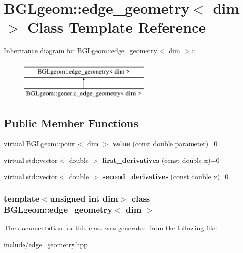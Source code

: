\hypertarget{classBGLgeom_1_1edge__geometry}{
\section{BGLgeom::edge\_\-geometry$<$ dim $>$ Class Template Reference}
\label{classBGLgeom_1_1edge__geometry}
}
Inheritance diagram for BGLgeom::edge\_\-geometry$<$ dim $>$::\begin{figure}[H]
\begin{center}
\leavevmode
\includegraphics[height=2cm]{classBGLgeom_1_1edge__geometry}
\end{center}
\end{figure}
\subsection*{Public Member Functions}
\begin{DoxyCompactItemize}
\item 
\hypertarget{classBGLgeom_1_1edge__geometry_ae4e0868c01e2e490eea053e6942b0aef}{
virtual \hyperlink{classBGLgeom_1_1point}{BGLgeom::point}$<$ dim $>$ {\bfseries value} (const double parameter)=0}
\label{classBGLgeom_1_1edge__geometry_ae4e0868c01e2e490eea053e6942b0aef}

\item 
\hypertarget{classBGLgeom_1_1edge__geometry_a41d857a2978d96127fc1797232183844}{
virtual std::vector$<$ double $>$ {\bfseries first\_\-derivatives} (const double x)=0}
\label{classBGLgeom_1_1edge__geometry_a41d857a2978d96127fc1797232183844}

\item 
\hypertarget{classBGLgeom_1_1edge__geometry_a29e57f380b8a1fe071a5a51b42873408}{
virtual std::vector$<$ double $>$ {\bfseries second\_\-derivatives} (const double x)=0}
\label{classBGLgeom_1_1edge__geometry_a29e57f380b8a1fe071a5a51b42873408}

\end{DoxyCompactItemize}
\subsubsection*{template$<$unsigned int dim$>$ class BGLgeom::edge\_\-geometry$<$ dim $>$}



The documentation for this class was generated from the following file:\begin{DoxyCompactItemize}
\item 
include/\hyperlink{edge__geometry_8hpp}{edge\_\-geometry.hpp}\end{DoxyCompactItemize}
